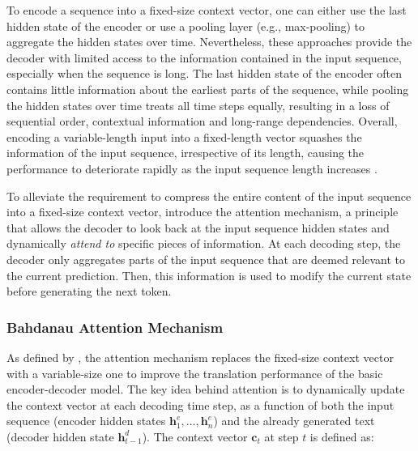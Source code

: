 To encode a sequence into a fixed-size context vector, one can either use the last hidden state of the encoder or use a pooling layer (e.g., max-pooling) to aggregate the hidden states over time. Nevertheless, these approaches provide the decoder with limited access to the information contained in the input sequence, especially when the sequence is long. The last hidden state of the encoder often contains little information about the earliest parts of the sequence, while pooling the hidden states over time treats all time steps equally, resulting in a loss of sequential order, contextual information and long-range dependencies. Overall, encoding a variable-length input into a fixed-length vector squashes the information of the input sequence, irrespective of its length, causing the performance to deteriorate rapidly as the input sequence length increases \citep{bahdanau2014neural}. 

To alleviate the requirement to compress the entire content of the input sequence into a fixed-size context vector, \citet{bahdanau2014neural} introduce the attention mechanism, a principle that allows the decoder to look back at the input sequence hidden states and dynamically \textit{attend to} specific pieces of information. At each decoding step, the decoder only aggregates parts of the input sequence that are deemed relevant to the current prediction. Then, this information is used to modify the current state before generating the next token. 


\subsubsection{Bahdanau Attention Mechanism}


As defined by \citet{bahdanau2014neural}, the attention mechanism replaces the fixed-size context vector with a variable-size one to improve the translation performance of the basic encoder-decoder model. The key idea behind attention is to dynamically update the context vector at each decoding time step, as a function of both the input sequence (encoder hidden states $\bm{h}^e_1, \ldots, \bm{h}^e_n$) and the already generated text (decoder hidden state $\bm{h}^d_{t-1}$). The context vector $\bm{c}_t$ at step $t$ is defined as:

